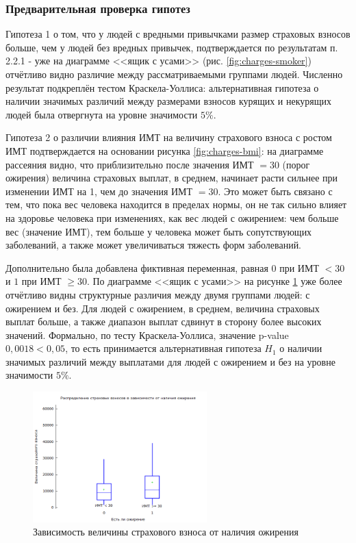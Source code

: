 \documentclass[a4paper,12pt]{article}
\begin{document}
\subsubsection{Предварительная проверка гипотез}

Гипотеза 1 о том, что у людей с вредными привычками размер страховых взносов больше, чем у людей без вредных привычек, подтверждается по результатам п. 2.2.1 - уже на диаграмме <<ящик с усами>> (рис. \ref{fig:charges-smoker}) отчётливо видно различие между рассматриваемыми группами людей. Численно результат подкреплён тестом Краскела-Уоллиса: альтернативная гипотеза о наличии значимых различий между размерами взносов курящих и некурящих людей была отвергнута на уровне значимости $5\%$.

Гипотеза 2 о различии влияния ИМТ на величину страхового взноса с ростом ИМТ подтверждается на основании рисунка \ref{fig:charges-bmi}: на диаграмме рассеяния видно, что приблизительно после значения ИМТ $= 30$ (порог ожирения) величина страховых выплат, в среднем, начинает расти сильнее при изменении ИМТ на 1, чем до значения ИМТ $= 30$. Это может быть связано с тем, что пока вес человека находится в пределах нормы, он не так сильно влияет на здоровье человека при изменениях, как вес людей с ожирением: чем больше вес (значение ИМТ), тем больше у человека может быть сопутствующих заболеваний, а также может увеличиваться тяжесть форм заболеваний.

Дополнительно была добавлена фиктивная переменная, равная $0$ при ИМТ $<30$ и $1$ при ИМТ $\ge30$. По диаграмме <<ящик с усами>> на рисунке \ref{fig:is_fat} уже более отчётливо видны структурные различия между двумя группами людей: с ожирением и без. Для людей с ожирением, в среднем, величина страховых выплат больше, а также диапазон выплат сдвинут в сторону более высоких значений. Формально, по тесту Краскела-Уоллиса, значение p-value $0,0018 < 0,05$, то есть принимается альтернативная гипотеза $H_1$ о наличии значимых различий между выплатами для людей с ожирением и без на уровне значимости $5\%.$

\begin{figure}[H]
	\includegraphics[width=0.6\textwidth]{../[graphics]/is_fat.png}
	\centering
	\caption{Зависимость величины страхового взноса от наличия ожирения}
	\label{fig:is_fat}
\end{figure}
\end{document}
